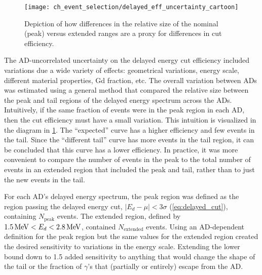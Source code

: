 \begin{figure}
    \centering
    \texttt{[image: ch\_event\_selection/delayed\_eff\_uncertainty\_cartoon]}
    \caption[Delayed energy efficiency diagram]{
        Depiction of how differences in the relative size
        of the nominal (peak) versus extended ranges
        are a proxy for differences in cut efficiency.
    }
    \label{fig:delayed_eff_unc_cartoon}
\end{figure}

The AD-uncorrelated uncertainty on the delayed energy cut efficiency
included variations due a wide variety of effects:
geometrical variations, energy scale, different material properties,
Gd fraction, etc.
The overall variation between ADs was estimated using a general method
that compared the relative size between the peak and tail regions
of the delayed energy spectrum across the ADs.
Intuitively, if the same fraction of events were in the peak region in each AD,
then the cut efficiency must have a small variation.
This intuition is visualized in the diagram in \cref{fig:delayed_eff_unc_cartoon}.
The ``expected'' curve has a higher efficiency
and few events in the tail.
Since the ``different tail'' curve has more events in the tail region,
it can be concluded that this curve has a lower efficiency.
In practice, it was more convenient to compare the number of events in the peak
to the total number of events in an extended region that included the peak and tail,
rather than to just the new events in the tail.

For each AD's delayed energy spectrum, the peak region was defined as
the region passing the delayed energy cut, $\vert E_d-\mu \vert < 3\sigma$
(\cref{eq:delayed_cut}), containing $N_\text{peak}$ events.
The extended region, defined by
$\SI{1.5}{\mega\electronvolt} < E_d < \SI{2.8}{\mega\electronvolt}$,
contained $N_\text{extended}$ events.
Using an AD-dependent definition for the peak region but
the same values for the extended region created
the desired sensitivity to variations in the energy scale.
Extending the lower bound down to \SI{1.5}{\mev} added sensitivity to
anything that would change the shape of the tail
or the fraction of $\gamma$'s that (partially or entirely) escape from the AD.

